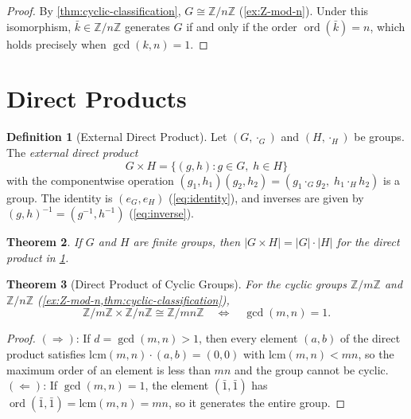 \documentclass[12pt,a4paper]{article}
\theoremstyle{definition}
\newtheorem{definition}{Definition}[section]
\theoremstyle{plain}
\newtheorem{theorem}[definition]{Theorem}
\theoremstyle{remark}
\newcommand{\Z}{\mathbb{Z}}
\newcommand{\ord}{\operatorname{ord}}
\begin{document}
\begin{proof}
By \cref{thm:cyclic-classification}, $G \cong \Z/n\Z$ (\cref{ex:Z-mod-n}).
Under this isomorphism, $\bar{k} \in \Z/n\Z$ generates $G$ if and only if the order
$\ord(\bar{k}) = n$, which holds precisely when $\gcd(k, n) = 1$.
\end{proof}


\section{Direct Products}\label{sec:direct}

\begin{definition}[External Direct Product]\label{def:direct-product}
Let $(G, \cdot_G)$ and $(H, \cdot_H)$ be groups.
The \emph{external direct product}
\begin{equation}\label{eq:direct}
    G \times H = \{(g, h) : g \in G, \; h \in H\}
\end{equation}
with the componentwise operation $(g_1, h_1)(g_2, h_2) = (g_1 \cdot_G g_2, \; h_1 \cdot_H h_2)$
is a group. The identity is $(e_G, e_H)$ (\cref{eq:identity}), and inverses
are given by $(g, h)^{-1} = (g^{-1}, h^{-1})$ (\cref{eq:inverse}).
\end{definition}

\begin{theorem}\label{thm:direct-order}
If $G$ and $H$ are finite groups, then
$|G \times H| = |G| \cdot |H|$ for the direct product in \cref{def:direct-product}.
\end{theorem}

\begin{theorem}[Direct Product of Cyclic Groups]\label{thm:Zm-Zn}
For the cyclic groups $\Z/m\Z$ and $\Z/n\Z$ (\cref{ex:Z-mod-n,thm:cyclic-classification}),
\begin{equation}\label{eq:Zm-Zn}
    \Z/m\Z \times \Z/n\Z \cong \Z/mn\Z
    \quad \Longleftrightarrow \quad
    \gcd(m, n) = 1.
\end{equation}
\end{theorem}

\begin{proof}
$(\Rightarrow)$: If $d = \gcd(m,n) > 1$, then every element $(a,b)$ of the direct
product satisfies $\text{lcm}(m,n) \cdot (a,b) = (0,0)$
with $\text{lcm}(m,n) < mn$, so the maximum order of an element 
is less than $mn$ and the group cannot be cyclic.
$(\Leftarrow)$: If $\gcd(m,n) = 1$, the element $(\bar{1}, \bar{1})$ has
$\ord(\bar{1}, \bar{1}) = \text{lcm}(m,n) = mn$, so it
generates the entire group.
\end{proof}
\end{document}
